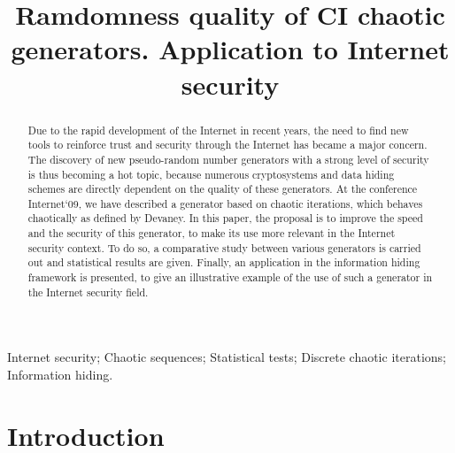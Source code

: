 \documentclass[10pt, a4paper, conference, compsocconf]{IEEEtran}
\begin{document}
\title{Ramdomness quality of CI chaotic generators. Application to Internet security}
\author{
}

\maketitle

\begin{abstract}
Due to the rapid development of the Internet in recent years, the need to find new tools to reinforce trust and security through the Internet has became a major concern. The discovery of new pseudo-random number generators with a strong level of security is thus becoming a hot topic, because numerous cryptosystems and data hiding schemes are directly dependent on the quality of these generators. At the conference Internet`09, we have described a generator based on chaotic iterations, which behaves chaotically as defined by Devaney. In this paper, the proposal is to improve the speed and the security of this generator, to make its use more relevant in the Internet security context. To do so, a comparative study between various generators is carried out and statistical results are given. Finally, an application in the information hiding framework is presented, to give an illustrative example of the use of such a generator in the Internet security field.
\end{abstract}
\begin{IEEEkeywords}
Internet security; Chaotic sequences; Statistical tests; Discrete chaotic iterations; Information hiding.

\end{IEEEkeywords}
\IEEEpeerreviewmaketitle

\section{Introduction}
\end{document}
